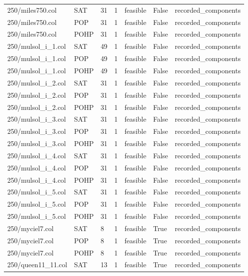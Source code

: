 \begin{table}[htbp]
\begin{tabular}{lllllll}
250/miles750.col & SAT & 31 & 1 & feasible & False & recorded\_components \\
250/miles750.col & POP & 31 & 1 & feasible & False & recorded\_components \\
250/miles750.col & POHP & 31 & 1 & feasible & False & recorded\_components \\
250/mulsol\_i\_1.col & SAT & 49 & 1 & feasible & False & recorded\_components \\
250/mulsol\_i\_1.col & POP & 49 & 1 & feasible & False & recorded\_components \\
250/mulsol\_i\_1.col & POHP & 49 & 1 & feasible & False & recorded\_components \\
250/mulsol\_i\_2.col & SAT & 31 & 1 & feasible & False & recorded\_components \\
250/mulsol\_i\_2.col & POP & 31 & 1 & feasible & False & recorded\_components \\
250/mulsol\_i\_2.col & POHP & 31 & 1 & feasible & False & recorded\_components \\
250/mulsol\_i\_3.col & SAT & 31 & 1 & feasible & False & recorded\_components \\
250/mulsol\_i\_3.col & POP & 31 & 1 & feasible & False & recorded\_components \\
250/mulsol\_i\_3.col & POHP & 31 & 1 & feasible & False & recorded\_components \\
250/mulsol\_i\_4.col & SAT & 31 & 1 & feasible & False & recorded\_components \\
250/mulsol\_i\_4.col & POP & 31 & 1 & feasible & False & recorded\_components \\
250/mulsol\_i\_4.col & POHP & 31 & 1 & feasible & False & recorded\_components \\
250/mulsol\_i\_5.col & SAT & 31 & 1 & feasible & False & recorded\_components \\
250/mulsol\_i\_5.col & POP & 31 & 1 & feasible & False & recorded\_components \\
250/mulsol\_i\_5.col & POHP & 31 & 1 & feasible & False & recorded\_components \\
250/myciel7.col & SAT & 8 & 1 & feasible & True & recorded\_components \\
250/myciel7.col & POP & 8 & 1 & feasible & True & recorded\_components \\
250/myciel7.col & POHP & 8 & 1 & feasible & True & recorded\_components \\
250/queen11\_11.col & SAT & 13 & 1 & feasible & True & recorded\_components \\

\end{tabular}
\end{table}
